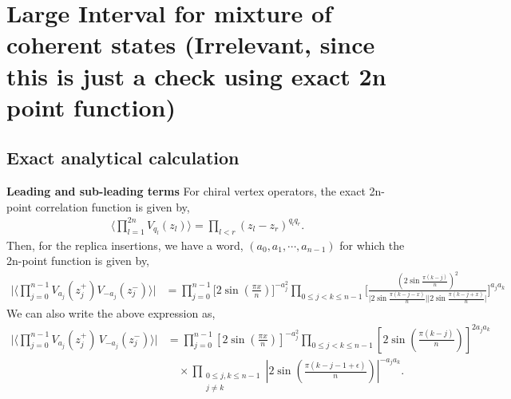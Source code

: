 \documentclass[11pt]{article}
\newcommand{\lb}{\left(}
\newcommand{\rb}{\right)}
\begin{document}
\section{Large Interval for mixture of coherent states (Irrelevant, since this is just a check using exact 2n point function)}
\subsection{Exact analytical calculation}
\textbf{Leading and sub-leading terms}
For chiral vertex operators, the exact 2n-point correlation function is given by,
\begin{align}
    \Big\langle \prod_{l=1}^{2n}V_{q_l}(z_l)\Big\rangle = \prod_{l<r} (z_l - z_r)^{q_lq_r}.
\end{align}
Then, for the replica insertions, we have a word, 
$(a_0, a_1, \cdots, a_{n-1})$ for which the 2n-point function is given by,
\begin{align}
    \Bigg| \Big\langle \prod_{j=0}^{n-1}V_{a_j}(z_j^+) V_{-a_j}(z_j^-) \Big\rangle \Bigg| &= \prod_{j=0}^{n-1}\Big[ 2\sin \lb\frac{\pi x}{n}\rb  \Big]^{-a_j^2} \prod_{0\leq j <k \leq n-1}\Bigg[\frac{\lb2\sin\frac{\pi (k-j)}{n}\rb^2}{\Big|2\sin \frac{\pi (k-j-x)}{n}\Big| \Big|2\sin \frac{\pi (k-j+x)}{n}\Big|}\Bigg]^{a_ja_k}
\end{align}
We can also write the above expression as,
\begin{align}
\Bigg|
\Bigg\langle
\prod_{j=0}^{n-1}
V_{a_j}(z_j^+)\,
V_{-a_j}(z_j^-)
\Bigg\rangle
\Bigg|
&=
\prod_{j=0}^{n-1}
\left[
2\sin\left(\frac{\pi x}{n}\right)
\right]^{-a_j^2}
\prod_{0\leq j<k\leq n-1}
\left[
2\sin\left(\frac{\pi(k-j)}{n}\right)
\right]^{2a_ja_k}
\nonumber\\
&\quad\times
\prod_{\substack{0\leq j,k\leq n-1\\ j\neq k}}
\left|
2\sin\left(
\frac{\pi(k-j-1+\epsilon)}{n}
\right)
\right|^{-a_ja_k}.
\end{align}
\end{document}
